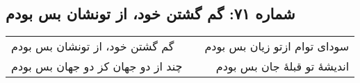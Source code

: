 \begin{center}
\section*{شماره ۷۱: گم گشتن خود، از تونشان بس بودم}
\label{sec:071}
\begin{longtable}{l p{0.5cm} r}
گم گشتن خود، از تونشان بس بودم
&&
سودای توام ازتو زیان بس بودم
\\
چند از دو جهان کز دو جهان بس بودم
&&
اندیشهٔ تو قبلهٔ جان بس بودم
\\
\end{longtable}
\end{center}
